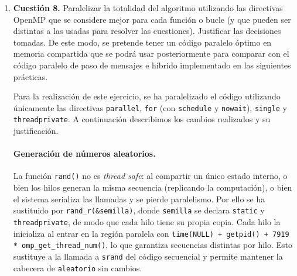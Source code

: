 \documentclass[12pt]{article}
\begin{document}
\begin{enumerate}
 \texttt{\#pragma omp ordered}
\begin{itemize}
    \item \textbf{Uso general:} Obliga a que la ejecución del bloque de código delimitado dentro de un bucle paralelo siga estrictamente el orden secuencial de las iteraciones.
    \item \textbf{Uso en el código:} \textbf{No tiene ningún sentido usarlo.} Todas las iteraciones de nuestros bucles (cruce, mutar, \textit{fitness}) son independientes entre sí. Usar \texttt{ordered} rompería el paralelismo, haciendo que el bucle se ejecute como si fuera totalmente secuencial.
\end{itemize}



\newpage

\item \textbf{Cuestión 8.} Paralelizar la totalidad del algoritmo utilizando las directivas OpenMP que se considere mejor para cada función o bucle (y que pueden ser distintas a las usadas para resolver las cuestiones). Justificar las decisiones tomadas. De este modo, se pretende tener un código paralelo óptimo en memoria compartida que se podrá usar posteriormente para comparar con el código paralelo de paso de mensajes e híbrido implementado en las siguientes prácticas.



Para la realización de este ejercicio, se ha paralelizado el código utilizando únicamente las directivas \texttt{parallel}, \texttt{for} (con \texttt{schedule} y \texttt{nowait}), \texttt{single} y \texttt{threadprivate}. A continuación describimos los cambios realizados y su justificación.

\paragraph{Generación de números aleatorios.}
La función \texttt{rand()} no es \textit{thread safe}: al compartir un único estado interno, o bien los hilos generan la misma secuencia (replicando la computación), o bien el sistema serializa las llamadas y se pierde paralelismo. Por ello se ha sustituido por \texttt{rand\_r(\&semilla)}, donde \texttt{semilla} se declara \texttt{static} y \texttt{threadprivate}, de modo que cada hilo tiene su propia copia. Cada hilo la inicializa al entrar en la región paralela con \texttt{time(NULL) + getpid() + 7919 * omp\_get\_thread\_num()}, lo que garantiza secuencias distintas por hilo. Esto sustituye a la llamada a \texttt{srand} del código secuencial y permite mantener la cabecera de \texttt{aleatorio} sin cambios.


\end{enumerate}
\end{document}

